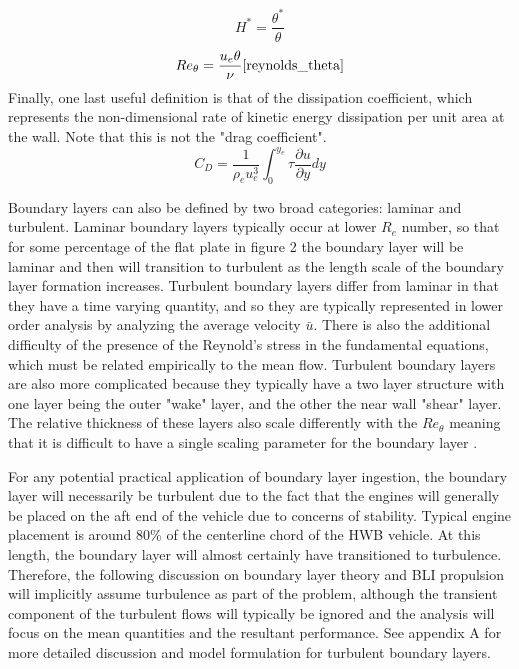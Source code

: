 \begin{equation} H^* = \frac{\theta^*}{\theta}\label{pseudo_energy_factor}\end{equation}
\begin{equation} Re_\theta =  \frac{u_e\theta}{\nu}\label{reynolds_theta}\ref{reynolds_theta}\end{equation}
Finally, one last useful definition is that of the dissipation coefficient, which represents the non-dimensional rate of kinetic energy dissipation per unit area at the wall.  Note that this is not the "drag coefficient".
\begin{equation} C_D = \frac{1}{\rho_e u_e^3}\int_0^{y_e}\tau \frac{\partial u}{\partial y}dy\end{equation}

Boundary layers can also be defined by two broad categories:  laminar and turbulent.  Laminar boundary layers typically occur at lower $R_e$ number, so that for some percentage of the flat plate in figure 2 the boundary layer will be laminar and then will transition to turbulent as the length scale of the boundary layer formation increases.  Turbulent boundary layers differ from laminar in that they have a time varying quantity, and so they are typically represented in lower order analysis by analyzing the average velocity $\bar{u}$.  There is also the additional difficulty of the presence of the Reynold's stress in the fundamental equations, which must be related empirically to the mean flow.  Turbulent boundary layers are also more complicated because they typically have a two layer structure with one layer being the outer "wake" layer, and the other the near wall "shear" layer.  The relative thickness of these layers also scale differently with the $Re_\theta$ meaning that it is difficult to have a single scaling parameter for the boundary layer \cite{DrelaThesis}.  

For any potential practical application of boundary layer ingestion, the boundary layer will necessarily be turbulent due to the fact that the engines will generally be placed on the aft end of the vehicle due to concerns of stability.  Typical engine placement is around 80\% of the centerline chord of the HWB vehicle.  At this length, the boundary layer will almost certainly have transitioned to turbulence.  Therefore, the following discussion on boundary layer theory and BLI propulsion will implicitly assume turbulence as part of the problem, although the transient component of the turbulent flows will typically be ignored and the analysis will focus on the mean quantities and the resultant performance.  See appendix A for more detailed discussion and model formulation for turbulent boundary layers.  



